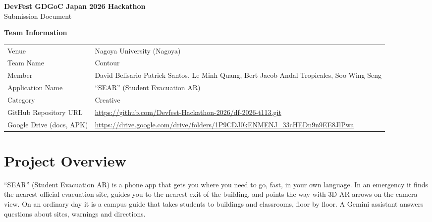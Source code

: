 \documentclass[11pt,a4paper]{article}
\begin{document}
\begin{center}
  {\LARGE\bfseries DevFest GDGoC Japan 2026 Hackathon}\\[6pt]
  {\large Submission Document}
\end{center}
\vspace{6pt}

\noindent\textbf{Team Information}\par\vspace{4pt}
\noindent
\begin{tabularx}{\textwidth}{@{}L{4.2cm}Y@{}}
\toprule
Venue                  & Nagoya University (Nagoya) \\
Team Name              & Contour \\
Member                 & David Belisario Patrick Santos, Le Minh Quang, Bert Jacob Andal Tropicales, Soo Wing Seng \\
Application Name       & ``SEAR'' (Student Evacuation AR) \\
Category               & Creative \\
GitHub Repository URL  & {\small\url{https://github.com/Devfest-Hackathon-2026/df-2026-t113.git}} \\
Google Drive (docs, APK) & {\small\url{https://drive.google.com/drive/folders/1P9CDJ0kENMENJ_33cHEDn9n9EE8JlPwa}} \\
\bottomrule
\end{tabularx}

\section{Project Overview}

``SEAR'' (Student Evacuation AR) is a phone app that gets you where you need to go, fast, in your own language.
In an emergency it finds the nearest official evacuation site, guides you to the nearest
exit of the building, and points the way with 3D AR arrows on the camera view. On an
ordinary day it is a campus guide that takes students to buildings and classrooms, floor
by floor. A Gemini assistant answers questions about sites, warnings and directions.
\end{document}
